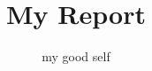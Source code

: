 \documentclass[11pt]{thesis}
\begin{document}
\title{My Report}
\author{my good self}
\date{}
\maketitle
\chapter{}
\newpage
\section{}
\end{document}
